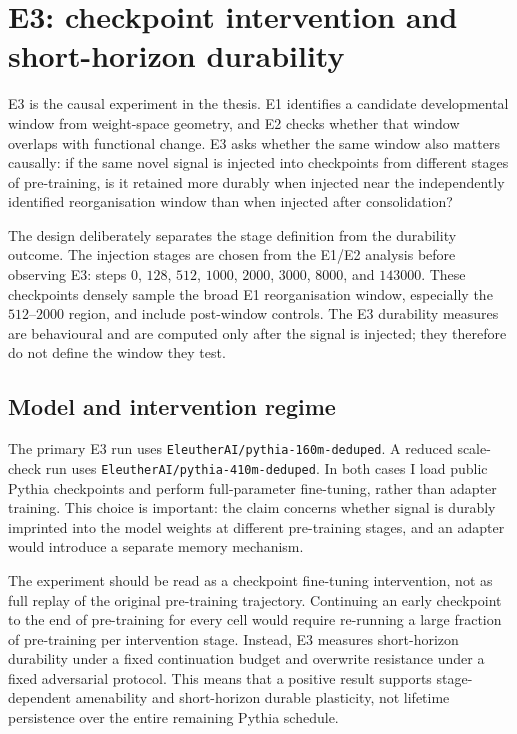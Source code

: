 
\section{E3: checkpoint intervention and short-horizon durability}
\label{sec:method-e3-final}

E3 is the causal experiment in the thesis.  E1 identifies a candidate developmental window from weight-space geometry, and E2 checks whether that window overlaps with functional change.  E3 asks whether the same window also matters causally: if the same novel signal is injected into checkpoints from different stages of pre-training, is it retained more durably when injected near the independently identified reorganisation window than when injected after consolidation?

The design deliberately separates the stage definition from the durability outcome.  The injection stages are chosen from the E1/E2 analysis before observing E3: steps $0$, $128$, $512$, $1000$, $2000$, $3000$, $8000$, and $143000$.  These checkpoints densely sample the broad E1 reorganisation window, especially the $512$--$2000$ region, and include post-window controls.  The E3 durability measures are behavioural and are computed only after the signal is injected; they therefore do not define the window they test.

\subsection{Model and intervention regime}
\label{sec:method-e3-model}

The primary E3 run uses \texttt{EleutherAI/pythia-160m-deduped}.  A reduced scale-check run uses \texttt{EleutherAI/pythia-410m-deduped}.  In both cases I load public Pythia checkpoints and perform full-parameter fine-tuning, rather than adapter training.  This choice is important: the claim concerns whether signal is durably imprinted into the model weights at different pre-training stages, and an adapter would introduce a separate memory mechanism.

The experiment should be read as a checkpoint fine-tuning intervention, not as full replay of the original pre-training trajectory.  Continuing an early checkpoint to the end of pre-training for every cell would require re-running a large fraction of pre-training per intervention stage.  Instead, E3 measures short-horizon durability under a fixed continuation budget and overwrite resistance under a fixed adversarial protocol.  This means that a positive result supports stage-dependent amenability and short-horizon durable plasticity, not lifetime persistence over the entire remaining Pythia schedule.

